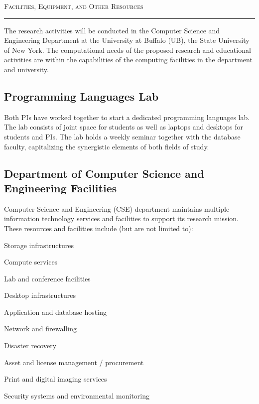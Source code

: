 

\usepackage{paralist}



\begin{center}
{\LARGE
\textsc{Facilities, Equipment, and Other Resources}
}
\end{center}
\hrule

\vspace{3mm}

The research activities will be conducted in the Computer Science and Engineering Department at the University at Buffalo (UB), the State University of New York.
The computational needs of the proposed research and educational activities are within the capabilities of the computing facilities in the department and university.

\subsection*{Programming Languages Lab}
Both PIs have worked together to start a dedicated programming languages lab.
The lab consists of joint space for students as well as laptops and desktops for students and PIs.
The lab holds a weekly seminar together with the database faculty, capitalizing the synergistic elements of both fields of study.

\subsection*{Department of Computer Science and Engineering Facilities}

Computer Science and Engineering (CSE) department maintains multiple information technology services and facilities to support its research mission.
These resources and facilities include (but are not limited to): 

\medskip 
\begin{compactitem}
  \item Storage infrastructures
  \item Compute services
  \item Lab and conference facilities
  \item Desktop infrastructures
  \item Application and database hosting
  \item Network and firewalling
  \item Disaster recovery
  \item Asset and license management / procurement
  \item Print and digital imaging services
  \item Security systems and environmental monitoring 
\end{compactitem}

